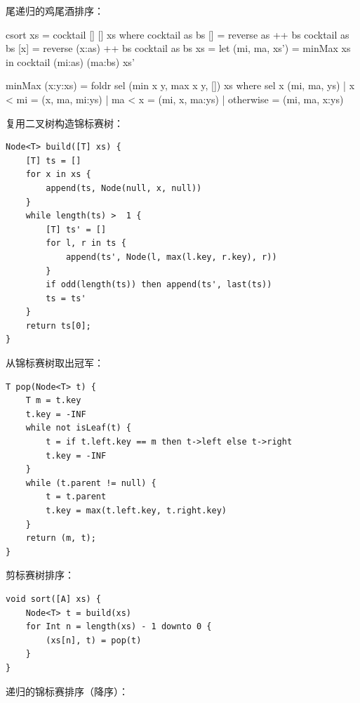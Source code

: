 \documentclass[b5paper]{ctexart}
\begin{document}
尾递归的鸡尾酒排序：

\begin{Haskell}
csort xs = cocktail [] [] xs
  where
    cocktail as bs []  = reverse as ++ bs
    cocktail as bs [x] = reverse (x:as) ++ bs
    cocktail as bs xs  = let (mi, ma, xs') = minMax xs
                         in cocktail (mi:as) (ma:bs) xs'

minMax (x:y:xs) = foldr sel (min x y, max x y, []) xs
  where
    sel x (mi, ma, ys) | x < mi = (x, ma, mi:ys)
                       | ma < x = (mi, x, ma:ys)
                       | otherwise = (mi, ma, x:ys)
\end{Haskell}

复用二叉树构造锦标赛树：

\begin{lstlisting}[language = Bourbaki]
Node<T> build([T] xs) {
    [T] ts = []
    for x in xs {
        append(ts, Node(null, x, null))
    }
    while length(ts) >  1 {
        [T] ts' = []
        for l, r in ts {
            append(ts', Node(l, max(l.key, r.key), r))
        }
        if odd(length(ts)) then append(ts', last(ts))
        ts = ts'
    }
    return ts[0];
}
\end{lstlisting}

从锦标赛树取出冠军：

\begin{lstlisting}[language = Bourbaki]
T pop(Node<T> t) {
    T m = t.key
    t.key = -INF
    while not isLeaf(t) {
        t = if t.left.key == m then t->left else t->right
        t.key = -INF
    }
    while (t.parent != null) {
        t = t.parent
        t.key = max(t.left.key, t.right.key)
    }
    return (m, t);
}
\end{lstlisting}

剪标赛树排序：

\begin{lstlisting}[language = Bourbaki]
void sort([A] xs) {
    Node<T> t = build(xs)
    for Int n = length(xs) - 1 downto 0 {
        (xs[n], t) = pop(t)
    }
}
\end{lstlisting}

递归的锦标赛排序（降序）：
\end{document}
